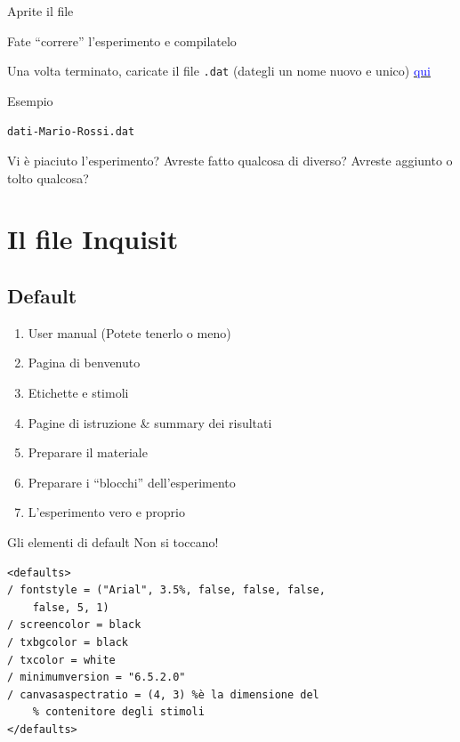 \documentclass{beamer}
\begin{document}
\begin{frame}
	Aprite il file 
	
	\vspace{3mm}
	Fate ``correre'' l'esperimento e compilatelo 
	
	\vspace{3mm}
	Una volta terminato, caricate il file \texttt{.dat} (dategli un nome nuovo e unico) \href{https://drive.google.com/drive/folders/1qdGvU1hlttucNOU2Sy_1EVKazj8QnBlu?usp=sharing}{\textcolor{blue}{qui}} 
	
	\begin{exampleblock}{Esempio}
		
		\texttt{dati-Mario-Rossi.dat}
	\end{exampleblock}
	
	\vspace{3mm}
	Vi è piaciuto l'esperimento? Avreste fatto qualcosa di diverso? Avreste aggiunto o tolto qualcosa? 
	

\end{frame}

\section{Il file Inquisit}

\subsection*{Default}

\begin{frame}
	\begin{enumerate}
		\item User manual (Potete tenerlo o meno)
		\item Pagina di benvenuto
		\item Etichette e stimoli
		\item Pagine di istruzione \& summary dei risultati
		\item Preparare il materiale
		\item Preparare i ``blocchi'' dell'esperimento
		\item L'esperimento vero e proprio
	\end{enumerate}
\end{frame}

\begin{frame}[fragile]{Gli elementi di default}
	Non si toccano!
	
	\begin{Verbatim}
<defaults>
/ fontstyle = ("Arial", 3.5%, false, false, false, 
    false, 5, 1)
/ screencolor = black
/ txbgcolor = black
/ txcolor = white
/ minimumversion = "6.5.2.0"
/ canvasaspectratio = (4, 3) %è la dimensione del 
	% contenitore degli stimoli
</defaults>
	\end{Verbatim}
\end{frame}
\end{document}
